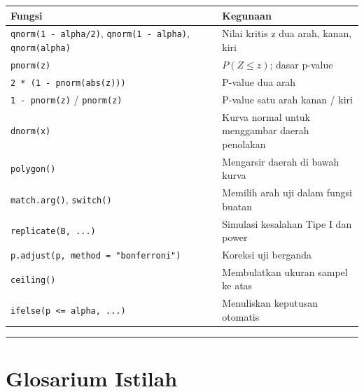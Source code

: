 \documentclass[
  indonesian,
  letterpaper,
]{book}
\newcounter{none} %
\begin{document}
{\def\LTcaptype{none} %
\begin{longtable}[]{@{}
  >{\raggedright\arraybackslash}p{}
  >{\raggedright\arraybackslash}p{}@{}}
\toprule\noalign{}
\begin{minipage}[b]{\linewidth}\raggedright
Fungsi
\end{minipage} & \begin{minipage}[b]{\linewidth}\raggedright
Kegunaan
\end{minipage} \\
\midrule\noalign{}
\endhead
\bottomrule\noalign{}
\endlastfoot
\texttt{qnorm(1\ -\ alpha/2)}, \texttt{qnorm(1\ -\ alpha)},
\texttt{qnorm(alpha)} & Nilai kritis z dua arah, kanan, kiri \\
\texttt{pnorm(z)} & \(P(Z \leq z)\); dasar p-value \\
\texttt{2\ *\ (1\ -\ pnorm(abs(z)))} & P-value dua arah \\
\texttt{1\ -\ pnorm(z)} / \texttt{pnorm(z)} & P-value satu arah kanan /
kiri \\
\texttt{dnorm(x)} & Kurva normal untuk menggambar daerah penolakan \\
\texttt{polygon()} & Mengarsir daerah di bawah kurva \\
\texttt{match.arg()}, \texttt{switch()} & Memilih arah uji dalam fungsi
buatan \\
\texttt{replicate(B,\ ...)} & Simulasi kesalahan Tipe I dan power \\
\texttt{p.adjust(p,\ method\ =\ "bonferroni")} & Koreksi uji berganda \\
\texttt{ceiling()} & Membulatkan ukuran sampel ke atas \\
\texttt{ifelse(p\ \textless{}=\ alpha,\ ...)} & Menuliskan keputusan
otomatis \\
\end{longtable}
}

\begin{center}\rule{0.5\linewidth}{0.5pt}\end{center}


\chapter{Glosarium Istilah}\label{glosarium-istilah-1}
\end{document}
